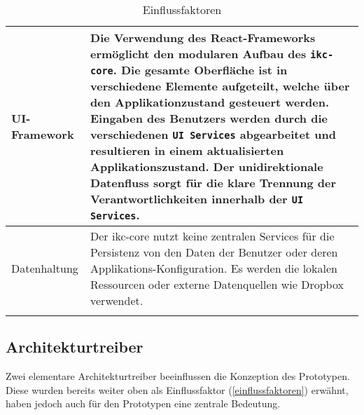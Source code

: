 \begin{longtable}{|p{4cm}|p{8.5cm}|}
    UI-Framework &  Die Verwendung des \gls{React}-Frameworks ermöglicht den modularen Aufbau des \texttt{ikc-core}. Die gesamte Oberfläche ist in verschiedene Elemente aufgeteilt, welche über den Applikationzustand gesteuert werden. Eingaben des Benutzers werden durch die verschiedenen \texttt{UI Services} abgearbeitet und resultieren in einem aktualisierten Applikationszustand. Der unidirektionale Datenfluss sorgt für die klare Trennung der Verantwortlichkeiten innerhalb der \texttt{UI Services}. \\\hline
    
    Datenhaltung & Der \gls{ikc-core} nutzt keine zentralen Services für die Persistenz von den Daten der Benutzer oder deren Applikations-Konfiguration. Es werden die lokalen Ressourcen oder externe Datenquellen wie \gls{Dropbox} verwendet. \\\hline
    \caption{Einflussfaktoren}
  \label{tab:einflussfaktoren}
\end{longtable}




\subsection{Architekturtreiber}
Zwei elementare Architekturtreiber beeinflussen die Konzeption des Prototypen. Diese wurden bereits weiter oben als Einflussfaktor (\autoref{einflussfaktoren}) erwähnt, haben jedoch auch für den Prototypen eine zentrale Bedeutung.

